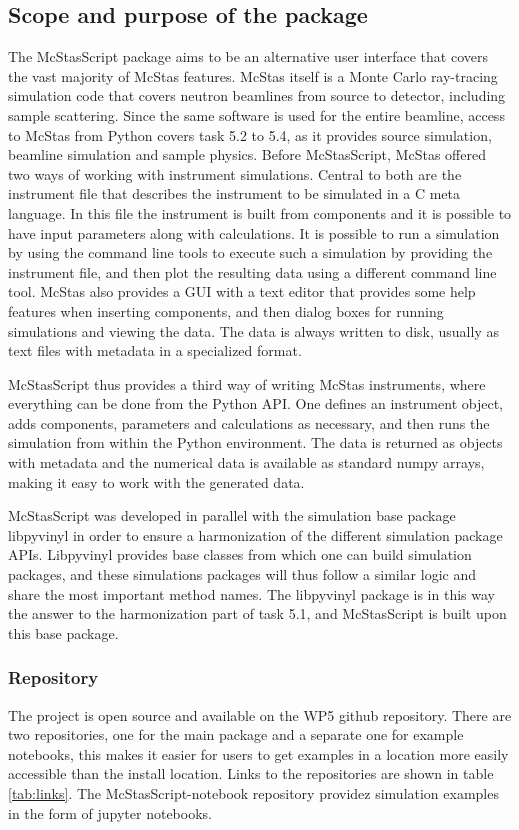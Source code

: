 \documentclass[11pt, a4paper]{article}
\begin{document}
\subsection{Scope and purpose of the package}
The McStasScript package aims to be an alternative user interface that covers the vast majority of McStas features. McStas itself is a Monte Carlo ray-tracing simulation code that covers neutron beamlines from source to detector, including sample scattering. Since the same software is used for the entire beamline, access to McStas from Python covers task 5.2 to 5.4, as it provides source simulation, beamline simulation and sample physics. Before McStasScript, McStas offered two ways of working with instrument simulations. Central to both are the instrument file that describes the instrument to be simulated in a C meta language. In this file the instrument is built from components and it is possible to have input parameters along with calculations. It is possible to run a simulation by using the command line tools to execute such a simulation by providing the instrument file, and then plot the resulting data using a different command line tool. McStas also provides a GUI with a text editor that provides some help features when inserting components, and then dialog boxes for running simulations and viewing the data. The data is always written to disk, usually as text files with metadata in a specialized format.

McStasScript thus provides a third way of writing McStas instruments, where everything can be done from the Python API. One defines an instrument object, adds components, parameters and calculations as necessary, and then runs the simulation from within the Python environment. The data is returned as objects with metadata and the numerical data is available as standard numpy arrays, making it easy to work with the generated data.

McStasScript was developed in parallel with the simulation base package
libpyvinyl in order to ensure a harmonization of the different simulation
package APIs. Libpyvinyl provides base classes from which one can build
simulation packages, and these simulations packages will thus follow a similar
logic and share the most important method names. The libpyvinyl package is in
this way the answer to the harmonization part of task 5.1, and McStasScript is
built upon this base package.

\subsubsection{Repository}
The project is open source and available on the WP5 github repository. There are
two repositories, one for the main package and a separate one for example
notebooks, this makes it easier for users to get examples in a location more
easily accessible than the install location. Links to the repositories are shown
in table \ref{tab:links}. The McStasScript-notebook repository providez
simulation examples in the form of jupyter notebooks.
\end{document}

